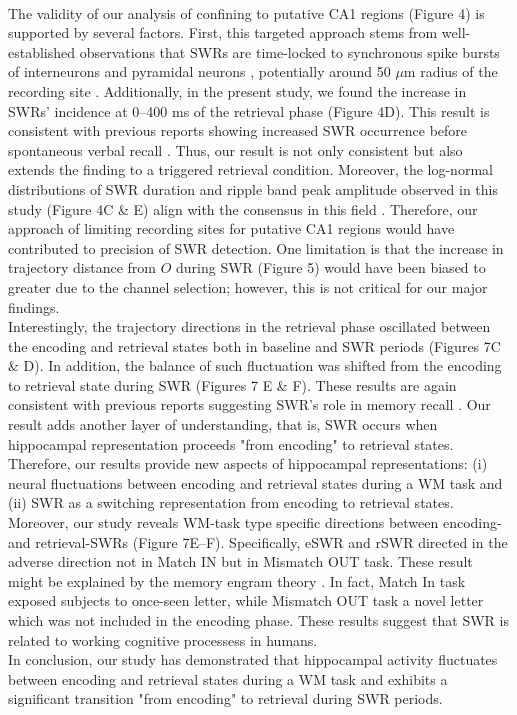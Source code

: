 \documentclass[final,3p,times,twocolumn]{elsarticle}
\begin{document}
\\
\indent
The validity of our analysis of confining to putative CA1 regions (Figure 4) is supported by several factors. First, this targeted approach stems from well-established observations that SWRs are time-locked to synchronous spike bursts of interneurons and pyramidal neurons \cite{buzsaki_two-stage_1989} \cite{quyen_cell_2008} \cite{royer_control_2012} \cite{hajos_input-output_2013}, potentially around 50 $\mu$m radius of the recording site \cite{schomburg_spiking_2012}. Additionally, in the present study, we found the increase in SWRs' incidence at 0--400 ms of the retrieval phase (Figure 4D). This result is consistent with previous reports showing increased SWR occurrence before spontaneous verbal recall \cite{norman_hippocampal_2019} \cite{norman_hippocampal_2021}. Thus, our result is not only consistent but also extends the finding to a triggered retrieval condition. Moreover, the log-normal distributions of SWR duration and ripple band peak amplitude observed in this study (Figure 4C \& E) align with the consensus in this field \cite{liu_consensus_2022}. Therefore, our approach of limiting recording sites for putative CA1 regions would have contributed to precision of SWR detection. One limitation is that the increase in trajectory distance from $O$ during SWR (Figure 5) would have been biased to greater due to the channel selection; however, this is not critical for our major findings.
\\
\indent
Interestingly, the trajectory directions in the retrieval phase oscillated between the encoding and retrieval states both in baseline and SWR periods (Figures 7C \& D). In addition, the balance of such fluctuation was shifted from the encoding to retrieval state during SWR (Figures 7 E \& F). 
These results are again consistent with previous reports suggesting SWR's role in memory recall \cite{norman_hippocampal_2019} \cite{norman_hippocampal_2021}. Our result adds another layer of understanding, that is, SWR occurs when hippocampal representation proceeds "from encoding" to retrieval states. Therefore, our results provide new aspects of hippocampal representations: (i) neural fluctuations between encoding and retrieval states during a WM task and (ii) SWR as a switching representation from encoding to retrieval states.
\\
\indent
Moreover, our study reveals WM-task type specific directions between encoding- and retrieval-SWRs (Figure 7E--F). Specifically, eSWR and rSWR directed in the adverse direction not in Match IN but in Mismatch OUT task. These result might be explained by the memory engram theory \cite{liu_optogenetic_2012}. In fact, Match In task exposed subjects to once-seen letter, while Mismatch OUT task a novel letter which was not included in the encoding phase. These results suggest that SWR is related to working cognitive processess in humans.
\\
\indent
In conclusion, our study has demonstrated that hippocampal activity fluctuates between encoding and retrieval states during a WM task and exhibits a significant transition "from encoding" to retrieval during SWR periods.
\label{sec:discussion}
\end{document}
